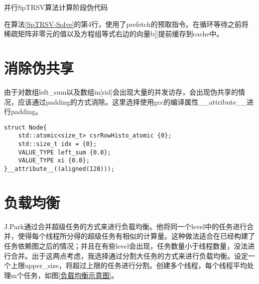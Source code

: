\begin{algorithm}[htbp]
    \caption{并行SpTRSV算法计算阶段伪代码\label{SpTRSV-Solve}}
\end{algorithm}

在算法\ref{SpTRSV-Solve}的第4行，使用了prefetch的预取指令。在循环等待之前将稀疏矩阵非零元的值以及方程组等式右边的向量b[]提前缓存到cache中。

\section{消除伪共享}

由于对数组left\_sum以及数组in[rid]会出现大量的并发访存，会出现伪共享的情况，应该通过padding的方式消除。这里选择使用gcc的编译属性\_\_attribute\_\_进行padding。

\begin{lstlisting}[caption={消除伪共享}]
    struct Node{
    std::atomic<size_t> csrRowHisto_atomic {0};
    std::size_t idx = {0};
    VALUE_TYPE left_sum {0.0};
    VALUE_TYPE xi {0.0};
}__attribute__((aligned(128)));
\end{lstlisting}

\section{负载均衡}\label{section:fuzaijunheng}

J.Park\cite{park2014sparsifying}通过合并超级任务的方式来进行负载均衡。他将同一个level中的任务进行合并，使得每个线程所分得的超级任务有相似的计算量。这种做法适合在已经构建了任务依赖图之后的情况；并且在有些level会出现，任务数量小于线程数量，没法进行合并。出于这两点考虑，我选择通过分割大任务的方式来进行负载均衡。设定一个上限upper\_size，将超过上限的任务进行分割。创建多个线程，每个线程平均处理m个任务，如图\ref{负载均衡示意图}。

